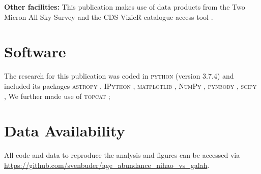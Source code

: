\documentclass[fleqn,usenatbib]{mnras}
\begin{document}
\textbf{Other facilities:} This publication makes use of data products from the Two Micron All Sky Survey \citep{Skrutskie2006} and the CDS VizieR catalogue access tool \citep{Vizier2000}.

\section*{Software}

The research for this publication was coded in \textsc{python} (version 3.7.4) and included its packages
\textsc{astropy} \citep[v. 3.2.2;][]{Robitaille2013,PriceWhelan2018},
\textsc{IPython} \citep[v. 7.8.0;][]{ipython},
\textsc{matplotlib} \citep[v. 3.1.3;][]{matplotlib},
\textsc{NumPy} \citep[v. 1.17.2;][]{numpy},
\textsc{pynbody} \citep[v. 1.1.0;][]{pynbody},
\textsc{scipy} \citep[version 1.3.1;][]{scipy},
We further made use of \textsc{topcat} \citep[version 4.7;][]{Taylor2005};

\section*{Data Availability}

All code and data to reproduce the analysis and figures can be accessed via \url{https://github.com/svenbuder/age_abundance_nihao_vs_galah}.









\bsp	%
\label{lastpage}
\end{document}
